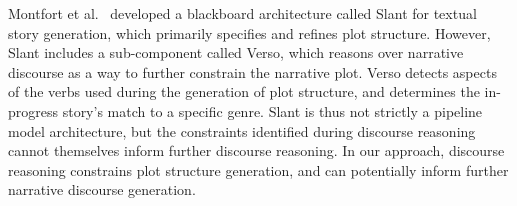 
Montfort et al.~\cite{montfort2013slant} developed a blackboard
architecture called Slant for textual story generation, which primarily
specifies and refines plot structure. However, Slant
includes a sub-component called Verso, which reasons over narrative 
discourse as a way to further constrain the narrative plot. Verso 
detects aspects of the verbs used during the generation of plot structure, 
and determines the in-progress story's match to a specific genre.
Slant is thus not strictly a pipeline model architecture, but the constraints 
identified during discourse reasoning cannot themselves inform further 
discourse reasoning. In our approach, discourse reasoning constrains plot structure
generation, and can potentially inform further narrative discourse generation.

